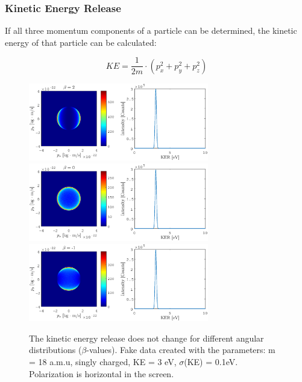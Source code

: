 \subsubsection{Kinetic Energy Release}

If all three momentum components of a particle can be determined, the kinetic energy of that particle can be calculated:

\begin{equation}
KE = \frac{1}{2 m} \cdot \left(p_x^2 + p_y^2 + p_z^2 \right)
\end{equation}

\begin{figure}[H]
    \centering
        {\includegraphics[width=0.7\textwidth]{Graphics/KER_dummy_data_beta_2.eps}
    }\\
        {\includegraphics[width=0.7\textwidth]{Graphics/KER_dummy_data_beta_0.eps}
    }\\
        {\includegraphics[width=0.7\textwidth]{Graphics/KER_dummy_data_beta_-1.eps}
    }
    \caption{The kinetic energy release does not change for different angular distributions ($\beta$-values). Fake data created with the parameters: m = 18 a.m.u, singly charged, KE = 3 eV, $\sigma$(KE) = 0.1eV. Polarization is horizontal in the screen.}
    \label{TS}
\end{figure}

